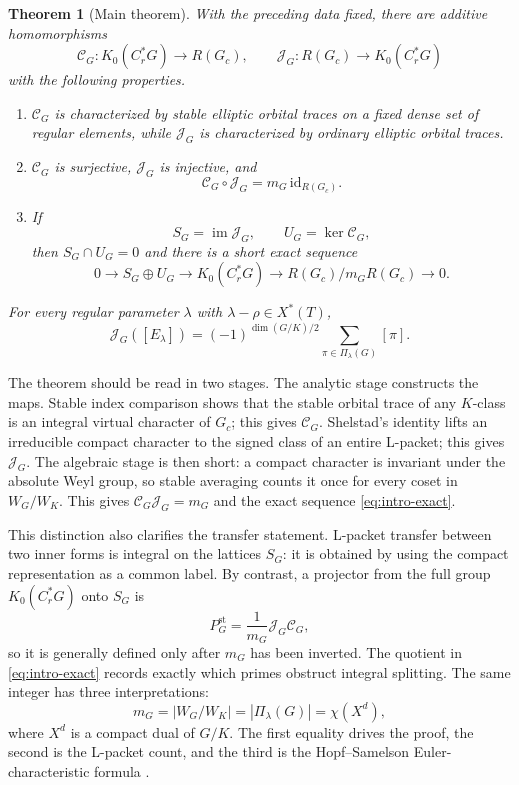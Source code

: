 \documentclass[11pt]{amsart}
\newtheorem{theorem}{Theorem}[section]
\theoremstyle{definition}
\theoremstyle{remark}
\begin{document}
\begin{theorem}[Main theorem]\label{thm:intro-main}
With the preceding data fixed, there are additive homomorphisms
\[
  \mathcal C_G:K_0(C_r^*G)\longrightarrow R(G_c),
  \qquad
  \mathcal J_G:R(G_c)\longrightarrow K_0(C_r^*G)
\]
with the following properties.
\begin{enumerate}[label=\textup{(\roman*)}]
\item \(\mathcal C_G\) is characterized by stable elliptic orbital traces on a
fixed dense set of regular elements, while \(\mathcal J_G\) is characterized
by ordinary elliptic orbital traces.
\item \(\mathcal C_G\) is surjective, \(\mathcal J_G\) is injective, and
\[
  \mathcal C_G\circ\mathcal J_G
  =m_G\,\mathrm{id}_{R(G_c)}.
\]
\item If
\[
  S_G=\operatorname{im}\mathcal J_G,
  \qquad
  U_G=\ker\mathcal C_G,
\]
then \(S_G\cap U_G=0\) and there is a short exact sequence
\begin{equation}\label{eq:intro-exact}
  0\longrightarrow S_G\oplus U_G
  \longrightarrow K_0(C_r^*G)
  \longrightarrow R(G_c)/m_GR(G_c)
  \longrightarrow0.
\end{equation}
\end{enumerate}
For every regular parameter \(\lambda\) with
\(\lambda-\rho\in X^*(T)\),
\begin{equation}\label{eq:intro-packet}
  \mathcal J_G([E_\lambda])
  =(-1)^{\dim(G/K)/2}
    \sum_{\pi\in\Pi_\lambda(G)}[\pi].
\end{equation}
\end{theorem}

The theorem should be read in two stages.  The analytic stage constructs the
maps.  Stable index comparison shows that the stable orbital trace of any
\(K\)-class is an integral virtual character of \(G_c\); this gives
\(\mathcal C_G\).  Shelstad's identity lifts an irreducible compact character
to the signed class of an entire L-packet; this gives \(\mathcal J_G\).  The
algebraic stage is then short: a compact character is invariant under the
absolute Weyl group, so stable averaging counts it once for every coset in
\(W_G/W_K\).  This gives
\(\mathcal C_G\mathcal J_G=m_G\) and the exact sequence
\eqref{eq:intro-exact}.

This distinction also clarifies the transfer statement.  L-packet transfer
between two inner forms is integral on the lattices \(S_G\): it is obtained by
using the compact representation as a common label.  By contrast, a projector
from the full group \(K_0(C_r^*G)\) onto \(S_G\) is
\[
  P_G^{\mathrm{st}}
  =\frac1{m_G}\mathcal J_G\mathcal C_G,
\]
so it is generally defined only after \(m_G\) has been inverted.  The quotient
in \eqref{eq:intro-exact} records exactly which primes obstruct integral
splitting.  The same integer has three interpretations:
\[
  m_G=|W_G/W_K|=|\Pi_\lambda(G)|=\chi(X^d),
\]
where \(X^d\) is a compact dual of \(G/K\).  The first equality drives the
proof, the second is the L-packet count, and the third is the Hopf--Samelson
Euler-characteristic formula \cite{HopfSamelson1940}.
\end{document}
